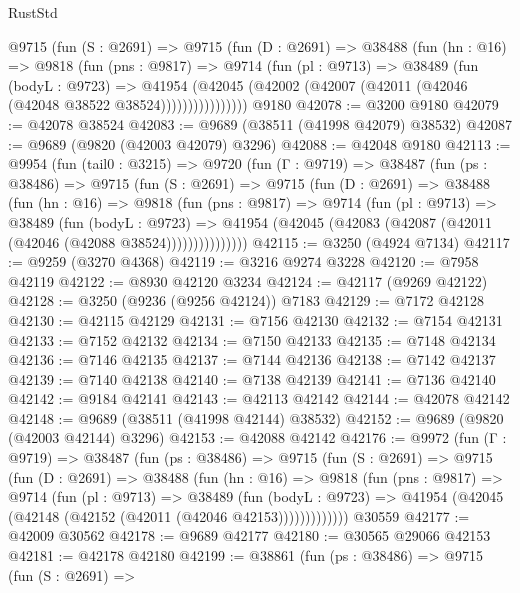 \begin{lexlean}{RustStd}
\begin{coremodule}
          @9715
            (fun (S : @2691) =>
            @9715
              (fun (D : @2691) =>
              @38488
                (fun (hn : @16) =>
                @9818
                  (fun (pns : @9817) =>
                  @9714
                    (fun (pl : @9713) =>
                    @38489
                      (fun (bodyL : @9723) =>
                      @41954
                        (@42045
                          (@42002 (@42007 (@42011 (@42046 (@42048 @38522 @38524))))))))))))))))
    @9180
@42078 := @3200 @9180
@42079 := @42078 @38524
@42083 := @9689 (@38511 (@41998 @42079) @38532)
@42087 := @9689 (@9820 (@42003 @42079) @3296)
@42088 := @42048 @9180
@42113 := @9954
    (fun (tail0 : @3215) =>
    @9720
      (fun (Γ : @9719) =>
      @38487
        (fun (ps : @38486) =>
        @9715
          (fun (S : @2691) =>
          @9715
            (fun (D : @2691) =>
            @38488
              (fun (hn : @16) =>
              @9818
                (fun (pns : @9817) =>
                @9714
                  (fun (pl : @9713) =>
                  @38489
                    (fun (bodyL : @9723) =>
                    @41954 (@42045 (@42083 (@42087 (@42011 (@42046 (@42088 @38524)))))))))))))))
@42115 := @3250 (@4924 @7134)
@42117 := @9259 (@3270 @4368)
@42119 := @3216 @9274 @3228
@42120 := @7958 @42119
@42122 := @8930 @42120 @3234
@42124 := @42117 (@9269 @42122)
@42128 := @3250 (@9236 (@9256 @42124)) @7183
@42129 := @7172 @42128
@42130 := @42115 @42129
@42131 := @7156 @42130
@42132 := @7154 @42131
@42133 := @7152 @42132
@42134 := @7150 @42133
@42135 := @7148 @42134
@42136 := @7146 @42135
@42137 := @7144 @42136
@42138 := @7142 @42137
@42139 := @7140 @42138
@42140 := @7138 @42139
@42141 := @7136 @42140
@42142 := @9184 @42141
@42143 := @42113 @42142
@42144 := @42078 @42142
@42148 := @9689 (@38511 (@41998 @42144) @38532)
@42152 := @9689 (@9820 (@42003 @42144) @3296)
@42153 := @42088 @42142
@42176 := @9972
    (fun (Γ : @9719) =>
    @38487
      (fun (ps : @38486) =>
      @9715
        (fun (S : @2691) =>
        @9715
          (fun (D : @2691) =>
          @38488
            (fun (hn : @16) =>
            @9818
              (fun (pns : @9817) =>
              @9714
                (fun (pl : @9713) =>
                @38489
                  (fun (bodyL : @9723) =>
                  @41954 (@42045 (@42148 (@42152 (@42011 (@42046 @42153)))))))))))))
    @30559
@42177 := @42009 @30562
@42178 := @9689 @42177
@42180 := @30565 @29066 @42153
@42181 := @42178 @42180
@42199 := @38861
    (fun (ps : @38486) =>
    @9715
      (fun (S : @2691) =>

\end{coremodule}
\end{lexlean}
